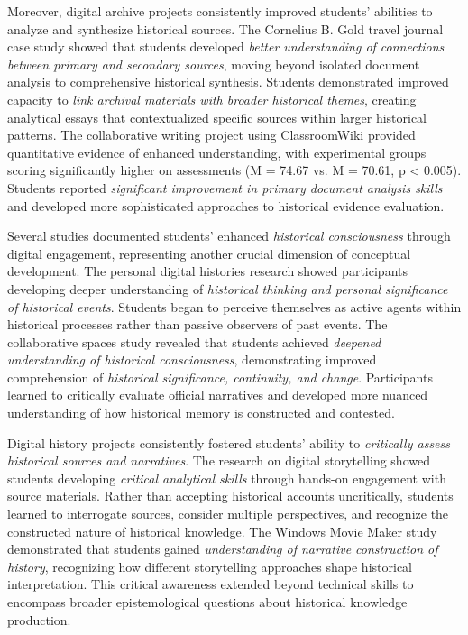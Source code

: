\documentclass[
hf,
]{ceurart}
\begin{document}
Moreover, digital archive projects consistently improved students' abilities to analyze and synthesize historical sources. The Cornelius B. Gold travel journal case study showed that students developed \textit{better understanding of connections between primary and secondary sources}, moving beyond isolated document analysis to comprehensive historical synthesis. Students demonstrated improved capacity to \textit{link archival materials with broader historical themes}, creating analytical essays that contextualized specific sources within larger historical patterns. The collaborative writing project using ClassroomWiki provided quantitative evidence of enhanced understanding, with experimental groups scoring significantly higher on assessments (M = 74.67 vs. M = 70.61, p < 0.005). Students reported \textit{significant improvement in primary document analysis skills} and developed more sophisticated approaches to historical evidence evaluation.

Several studies documented students' enhanced \textit{historical consciousness} through digital engagement, representing another crucial dimension of conceptual development. The personal digital histories research showed participants developing deeper understanding of \textit{historical thinking and personal significance of historical events}. Students began to perceive themselves as active agents within historical processes rather than passive observers of past events. The collaborative spaces study revealed that students achieved \textit{deepened understanding of historical consciousness}, demonstrating improved comprehension of \textit{historical significance, continuity, and change}. Participants learned to critically evaluate official narratives and developed more nuanced understanding of how historical memory is constructed and contested.

Digital history projects consistently fostered students' ability to \textit{critically assess historical sources and narratives}. The research on digital storytelling showed students developing \textit{critical analytical skills} through hands-on engagement with source materials. Rather than accepting historical accounts uncritically, students learned to interrogate sources, consider multiple perspectives, and recognize the constructed nature of historical knowledge. The Windows Movie Maker study demonstrated that students gained \textit{understanding of narrative construction of history}, recognizing how different storytelling approaches shape historical interpretation. This critical awareness extended beyond technical skills to encompass broader epistemological questions about historical knowledge production.
\end{document}

